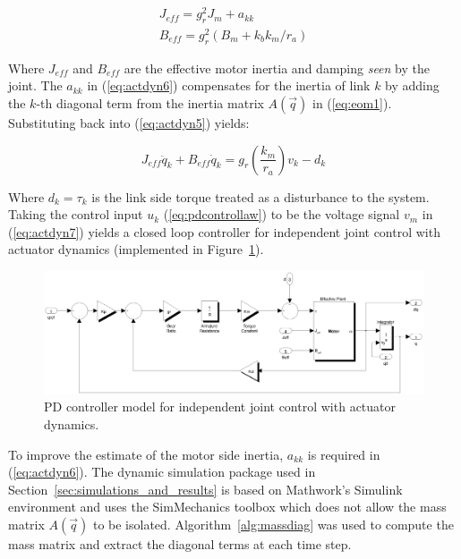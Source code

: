 \begin{equation}
	\begin{array}{l}
		{J_{eff}} = g_r^2{J_m} + {a_{kk}}\\
		{B_{eff}} = g_r^2({B_m} + {k_b}{k_m}/{r_a})
	\end{array}
	\label{eq:actdyn6}
\end{equation}

Where ${J_{eff}}$ and ${B_{eff}}$ are the effective motor inertia and damping \emph{seen} by the joint. The ${a_{kk}}$ in (\ref{eq:actdyn6}) compensates for the inertia of link $k$ by adding the $k$-th diagonal term from the inertia matrix $A(\vec{q})$ in (\ref{eq:eom1}). Substituting back into (\ref{eq:actdyn5}) yields: 

\begin{equation}
	{J_{eff}}{\ddot q_k} + {B_{eff}}{\dot q_k} = g_r^{}\left( {\frac{{{k_m}}}{{{r_a}}}} \right){v_k} - {d_k}
	\label{eq:actdyn7}
\end{equation}

Where ${d_k} = \tau _k$ is the link side torque treated as a disturbance to the system. Taking the control input $u _k$ (\ref{eq:pdcontrollaw}) to be the voltage signal $v _m$ in (\ref{eq:actdyn7}) yields a closed loop controller for independent joint control with actuator dynamics (implemented in Figure~\ref{fig:pdmotorcontroller}).

\begin{figure}[!h]
	\centering
    \includegraphics[scale=0.5]{fig/experiments/pdmotorcontroller.eps} 
  	\caption{PD controller model for independent joint control with actuator dynamics.}
	\label{fig:pdmotorcontroller}
\end{figure}

To improve the estimate of the motor side inertia, $a_{kk}$ is required in (\ref{eq:actdyn6}). The dynamic simulation package used in Section~\ref{sec:simulations_and_results} is based on Mathwork's Simulink environment and uses the SimMechanics toolbox which does not allow the mass matrix $A(\vec{q})$ to be isolated. Algorithm~\ref{alg:massdiag} was used to compute the mass matrix and extract the diagonal terms at each time step.  

